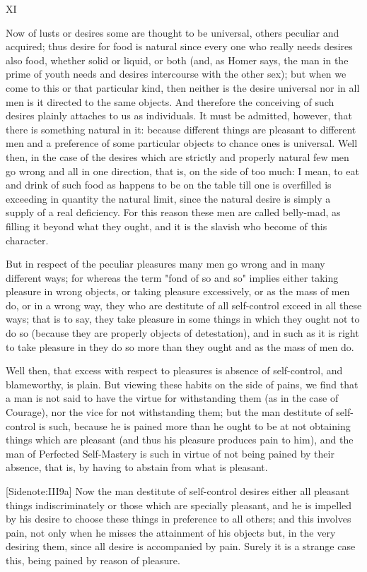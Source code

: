 XI

Now of lusts or desires some are thought to be universal, others
peculiar and acquired; thus desire for food is natural since every one
who really needs desires also food, whether solid or liquid, or both
(and, as Homer says, the man in the prime of youth needs and desires
intercourse with the other sex); but when we come to this or that
particular kind, then neither is the desire universal nor in all men is
it directed to the same objects. And therefore the conceiving of such
desires plainly attaches to us as individuals. It must be admitted,
however, that there is something natural in it: because different things
are pleasant to different men and a preference of some particular
objects to chance ones is universal. Well then, in the case of the
desires which are strictly and properly natural few men go wrong and all
in one direction, that is, on the side of too much: I mean, to eat and
drink of such food as happens to be on the table till one is overfilled
is exceeding in quantity the natural limit, since the natural desire
is simply a supply of a real deficiency. For this reason these men are
called belly-mad, as filling it beyond what they ought, and it is the
slavish who become of this character.

But in respect of the peculiar pleasures many men go wrong and in many
different ways; for whereas the term "fond of so and so" implies either
taking pleasure in wrong objects, or taking pleasure excessively, or as
the mass of men do, or in a wrong way, they who are destitute of all
self-control exceed in all these ways; that is to say, they take
pleasure in some things in which they ought not to do so (because they
are properly objects of detestation), and in such as it is right to take
pleasure in they do so more than they ought and as the mass of men do.

Well then, that excess with respect to pleasures is absence of
self-control, and blameworthy, is plain. But viewing these habits on the
side of pains, we find that a man is not said to have the virtue for
withstanding them (as in the case of Courage), nor the vice for not
withstanding them; but the man destitute of self-control is such,
because he is pained more than he ought to be at not obtaining things
which are pleasant (and thus his pleasure produces pain to him), and the
man of Perfected Self-Mastery is such in virtue of not being pained by
their absence, that is, by having to abstain from what is pleasant.

[Sidenote:III9a] Now the man destitute of self-control desires either
all pleasant things indiscriminately or those which are specially
pleasant, and he is impelled by his desire to choose these things in
preference to all others; and this involves pain, not only when he
misses the attainment of his objects but, in the very desiring them,
since all desire is accompanied by pain. Surely it is a strange case
this, being pained by reason of pleasure.

